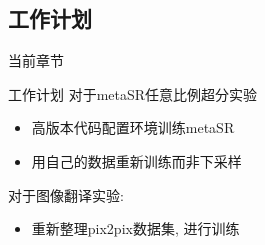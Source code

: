 \subsection{工作计划}
\begin{frame}{当前章节}
\end{frame}

\begin{frame}{工作计划}
    对于metaSR任意比例超分实验
    \begin{itemize}
        \item 高版本代码配置环境训练metaSR
        \item 用自己的数据重新训练而非下采样
    \end{itemize}

    对于图像翻译实验:
    \begin{itemize}
        \item 重新整理pix2pix数据集, 进行训练
    \end{itemize}
\end{frame}

